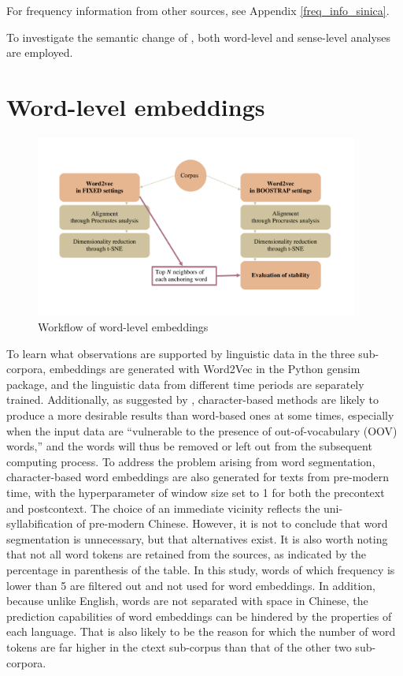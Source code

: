 For frequency information from other sources, see Appendix \ref{freq_info_sinica}.

To investigate the semantic change of \jia\rspace, both word-level and sense-level analyses are employed.

\section{Word-level embeddings}

\begin{figure}[H]
  \centering
  \includegraphics[height=0.4\textheight,width=0.95\textwidth,keepaspectratio]{figures_new/workflow_word_level.pdf}
  \caption{Workflow of word-level embeddings}
  \label{fig:workflow_word_level}
\end{figure}

To learn what observations are supported by linguistic data in the three sub-corpora, embeddings are generated with Word2Vec in the Python gensim package, and the linguistic data from different time periods are separately trained. Additionally, as suggested by \textcite{li2019word}, character-based methods are likely to produce a more desirable results than word-based ones at some times, especially when the input data are ``vulnerable to the presence of out-of-vocabulary (OOV) words,'' and the words will thus be removed or left out from the subsequent computing process. To address the problem arising from word segmentation, character-based word embeddings are also generated for texts from pre-modern time, with the hyperparameter of window size set to 1 for both the precontext and postcontext. The choice of an immediate vicinity reflects the uni-syllabification of pre-modern Chinese. However, it is not to conclude that word segmentation is unnecessary, but that alternatives exist.  It is also worth noting that not all word tokens are retained from the sources, as indicated by the percentage in parenthesis of the table. In this study, words of which frequency is lower than 5 are filtered out and not used for word embeddings. In addition, because unlike English, words are not separated with space in Chinese, the prediction capabilities of word embeddings can be hindered by the properties of each language. That is also likely to be the reason for which the number of word tokens are far higher in the \gls{ctext} sub-corpus than that of the other two sub-corpora.

